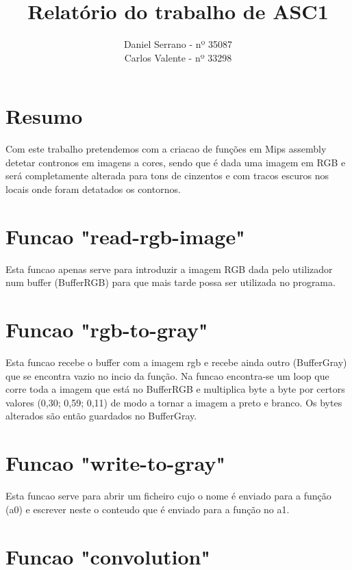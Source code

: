 \documentclass[11pt]{article}
\title{Relatório do trabalho de ASC1}
\author{Daniel Serrano - nº 35087 \\ Carlos Valente - nº 33298}
\begin{document}
\maketitle
\section{Resumo}

Com este trabalho pretendemos com a criacao de funções em Mips assembly detetar contronos em imagens a cores, sendo que é dada uma imagem em RGB e será completamente alterada para tons de cinzentos e com tracos escuros nos locais onde foram detatados os contornos.

\section{Funcao "read-rgb-image"}

Esta funcao apenas serve para introduzir a imagem RGB dada pelo utilizador num buffer (BufferRGB) para que mais tarde possa ser utilizada no programa.


\section{Funcao "rgb-to-gray"}

Esta funcao recebe o buffer com a imagem rgb e recebe ainda outro (BufferGray) que se encontra vazio no incio da função.
Na funcao encontra-se um loop que corre toda a imagem que está no BufferRGB e multiplica byte a byte por certors valores (0,30; 0,59; 0,11) de modo a tornar a imagem a preto e branco. Os bytes alterados são então guardados no BufferGray.

\section{Funcao "write-to-gray"}

Esta funcao serve para abrir um ficheiro cujo o nome é enviado para a função (a0) e escrever neste o conteudo que é enviado para a função no a1.

\section{Funcao "convolution"}
\end{document}
